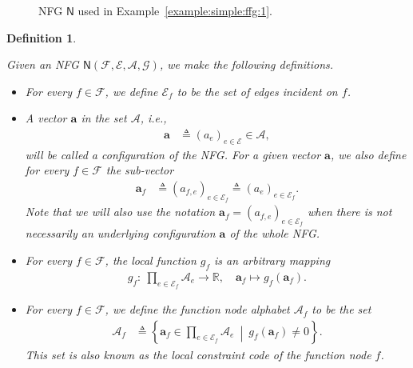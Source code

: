 \documentclass[journal, twocolumn]{IEEEtran}
\renewcommand{\mathbf}[1]{{\bm{#1}}}
\newcommand{\ie}{\emph{i.e.}}
\newcommand{\R}{\mathbb{R}}
\newcommand{\vect}[1]{\mathbf{#1}}
\newcommand{\set}[1]{\mathcal{#1}}
\newcommand{\graph}[1]{\mathsf{#1}}
\newcommand{\defeq}{\triangleq}
\newcommand{\setA}{\set{A}}
\newcommand{\setE}{\set{E}}
\newcommand{\setF}{\set{F}}
\newcommand{\setG}{\set{G}}
\newcommand{\va}{\vect{a}}
\newcommand{\graphN}{\graph{N}}
\newcommand{\?}{\mathrm{?}}
\newtheorem{Definition}[Lemma]{Definition}
\begin{document}
\begin{figure}
  \begin{center}
  \end{center}
  \caption{NFG $\graphN$ used in Example~\ref{example:simple:ffg:1}.}
  \label{fig:example:simple:ffg:1}
\end{figure}


\begin{Definition}
  \label{def:normal:factor:graph:2}

  Given an NFG $\graphN(\setF,\setE, \setA, \setG)$, we make
  the following definitions.
  \begin{itemize}

  \item For every $f \in \setF$, we define $\setE_f$ to be the set of edges
    incident on $f$.

  \item A vector $\va$ in the set $\setA$, \ie,
    \begin{align*}
      \va 
        &\defeq
           (a_e)_{e \in \setE}
         \in \setA,
    \end{align*}
    will be called a configuration of the NFG. For a given
    vector $\va$, we also define for every $f \in \setF$ the sub-vector
    \begin{align*}
      \va_f
        &\defeq
           (a_{f,e})_{e \in \setE_f}
         \defeq
           (a_e)_{e \in \setE_f}.
    \end{align*}
    Note that we will also use the notation $\va_f = (a_{f,e})_{e \in
      \setE_f}$ when there is not necessarily an underlying configuration
    $\va$ of the whole NFG.

  \item For every $f \in \setF$, the local function $g_f$ is an arbitrary
    mapping
    \begin{align*}
      g_f: \
        \prod_{e \in \setE_f}
          \setA_e
            \to \R,
       \quad
       \va_f
         \mapsto
           g_f(\va_f).
    \end{align*}

  \item For every $f \in \setF$, we define the function node alphabet
    $\setA_f$ to be the set
    \begin{align*}
      \setA_f
        &\defeq
            \left\{
              \va_f \in \prod_{e \in \setE_f} \setA_e
            \
            \middle|
            \
              g_f(\va_f) \neq 0
            \right\}.
    \end{align*}
    This set is also known as the local constraint code of the function node
    $f$.


\end{itemize}
\end{Definition}
\end{document}
